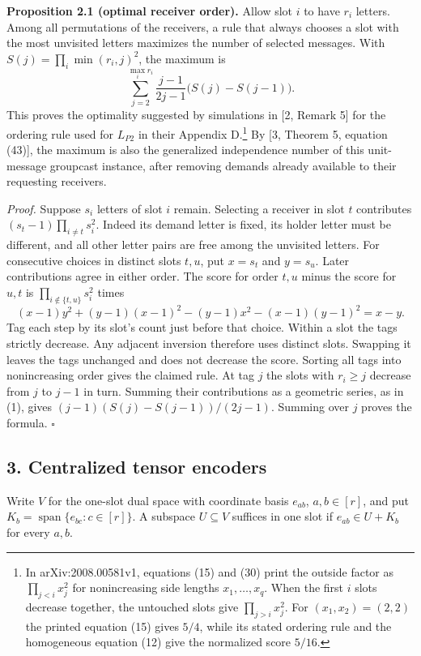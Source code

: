 \documentclass[
  10pt,
]{article}
\begin{document}
\textbf{Proposition 2.1 (optimal receiver order).} Allow slot \(i\) to
have \(r_i\) letters. Among all permutations of the receivers, a rule
that always chooses a slot with the most unvisited letters maximizes the
number of selected messages. With \(S(j)=\prod_i\min(r_i,j)^2\), the
maximum is \[
       \sum_{j=2}^{\max_i r_i}\frac{j-1}{2j-1}\bigl(S(j)-S(j-1)\bigr).
\] This proves the optimality suggested by simulations in {[}2, Remark
5{]} for the ordering rule used for \(L_{P2}\) in their Appendix
D.\footnote{In arXiv:2008.00581v1, equations (15) and (30) print the
  outside factor as \(\prod_{j<i}x_j^2\) for nonincreasing side lengths
  \(x_1,\ldots,x_q\). When the first \(i\) slots decrease together, the
  untouched slots give \(\prod_{j>i}x_j^2\). For \((x_1,x_2)=(2,2)\) the
  printed equation (15) gives \(5/4\), while its stated ordering rule
  and the homogeneous equation (12) give the normalized score \(5/16\).}
By {[}3, Theorem 5, equation (43){]}, the maximum is also the
generalized independence number of this unit-message groupcast instance,
after removing demands already available to their requesting receivers.

\emph{Proof.} Suppose \(s_i\) letters of slot \(i\) remain. Selecting a
receiver in slot \(t\) contributes \((s_t-1)\prod_{i\ne t}s_i^2\).
Indeed its demand letter is fixed, its holder letter must be different,
and all other letter pairs are free among the unvisited letters. For
consecutive choices in distinct slots \(t,u\), put \(x=s_t\) and
\(y=s_u\). Later contributions agree in either order. The score for
order \(t,u\) minus the score for \(u,t\) is
\(\prod_{i\notin\{t,u\}}s_i^2\) times \[
 (x-1)y^2+(y-1)(x-1)^2-(y-1)x^2-(x-1)(y-1)^2=x-y .
\] Tag each step by its slot's count just before that choice. Within a
slot the tags strictly decrease. Any adjacent inversion therefore uses
distinct slots. Swapping it leaves the tags unchanged and does not
decrease the score. Sorting all tags into nonincreasing order gives the
claimed rule. At tag \(j\) the slots with \(r_i\ge j\) decrease from
\(j\) to \(j-1\) in turn. Summing their contributions as a geometric
series, as in (1), gives \((j-1)(S(j)-S(j-1))/(2j-1)\). Summing over
\(j\) proves the formula. \(\square\)

\subsection{3. Centralized tensor
encoders}\label{centralized-tensor-encoders}

Write \(V\) for the one-slot dual space with coordinate basis
\(e_{ab}\), \(a,b\in[r]\), and put
\(K_b=\operatorname{span}\{e_{bc}:c\in[r]\}\). A subspace
\(U\subseteq V\) suffices in one slot if \(e_{ab}\in U+K_b\) for every
\(a,b\).
\end{document}
